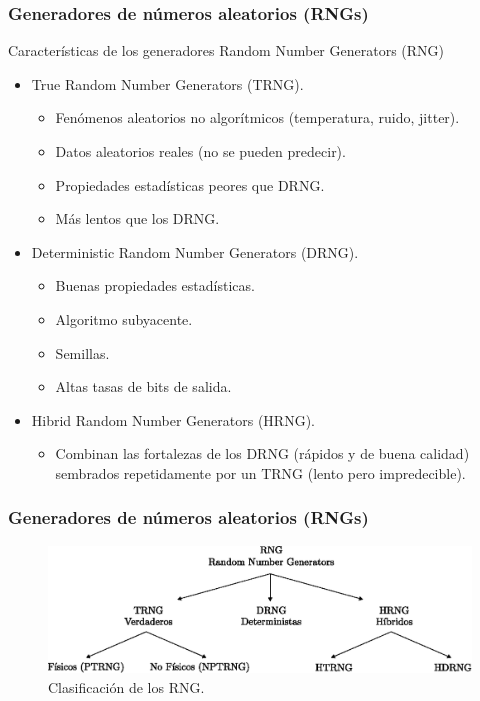 \documentclass[10pt]{beamer}
\begin{document}
\begin{frame}
    \frametitle{Generadores de números aleatorios (RNGs)}
    \begin{block}{Características de los generadores}
        \justifying
        Random Number Generators (RNG)
       \begin{footnotesize}
            \begin{itemize}
            \item True Random Number Generators (TRNG).
            \begin{itemize}
                \item Fenómenos aleatorios no algorítmicos (temperatura, ruido, jitter).
                \item Datos aleatorios reales (no se pueden predecir).
                \item Propiedades estadísticas peores que DRNG.
                \item Más lentos que los DRNG.
            \end{itemize}
            \item Deterministic Random Number Generators (DRNG).
            \begin{itemize}
                \item Buenas propiedades estadísticas.
                \item Algoritmo subyacente.
                \item Semillas.
                \item Altas tasas de bits de salida.
            \end{itemize}
            \item Hibrid Random Number Generators (HRNG).
            \begin{itemize}
                \item Combinan las fortalezas de los DRNG (rápidos y de buena calidad) sembrados repetidamente por un TRNG (lento pero impredecible).
            \end{itemize}
        \end{itemize}
       \end{footnotesize}
	\end{block}
\end{frame}


\begin{frame}
    \frametitle{Generadores de números aleatorios (RNGs)}
	\begin{figure}[hbtp]
	    \centering
	    \includegraphics[width=1.0\textwidth]{K0_clasificacion}
	    \caption{Clasificación de los RNG.}
        \label{fig:K0_clasificacion}
    \end{figure}
\end{frame}
\end{document}
